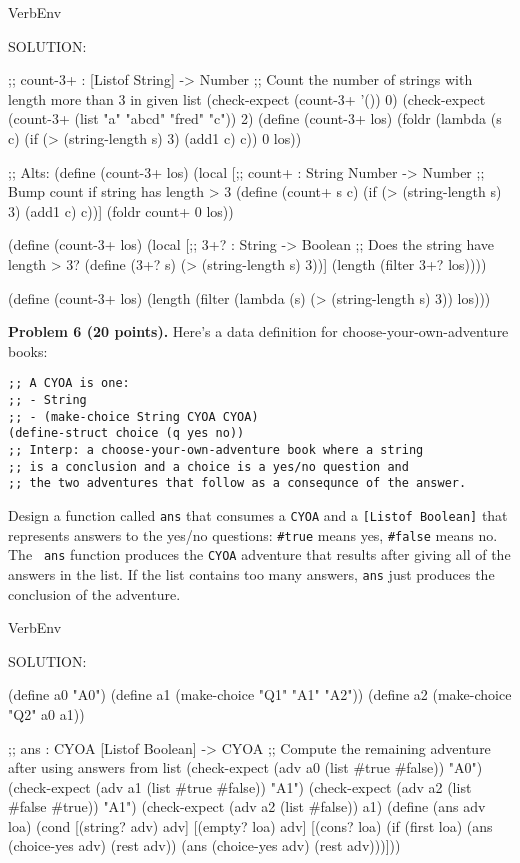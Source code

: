 \documentclass[12pt]{article}
\begin{document}
\begin{SaveVerbatim}{VerbEnv}


SOLUTION:

;; count-3+ : [Listof String] -> Number
;; Count the number of strings with length more than 3 in given list
(check-expect (count-3+ '()) 0)
(check-expect (count-3+ (list "a" "abcd" "fred" "c")) 2)
(define (count-3+ los)
  (foldr (lambda (s c) (if (> (string-length s) 3) (add1 c) c)) 0 los))

;; Alts:
(define (count-3+ los)
  (local [;; count+ : String Number -> Number
          ;; Bump count if string has length > 3
          (define (count+ s c) 
            (if (> (string-length s) 3) (add1 c) c))]
    (foldr count+ 0 los))

(define (count-3+ los)
  (local [;; 3+? : String -> Boolean
          ;; Does the string have length > 3?
          (define (3+? s) 
            (> (string-length s) 3))]
    (length (filter 3+? los))))

(define (count-3+ los)
  (length (filter (lambda (s) (> (string-length s) 3)) los)))
\end{SaveVerbatim}





\newpage

\noindent
{\bf Problem 6 (20 points).}
%
Here's a data definition for choose-your-own-adventure books:
\begin{verbatim}
;; A CYOA is one:
;; - String
;; - (make-choice String CYOA CYOA)
(define-struct choice (q yes no))
;; Interp: a choose-your-own-adventure book where a string
;; is a conclusion and a choice is a yes/no question and
;; the two adventures that follow as a consequnce of the answer.
\end{verbatim}

\noindent
Design a function called {\tt ans} that consumes a {\tt CYOA} and a
{\tt [Listof Boolean]} that represents answers to the yes/no
questions: {\tt \#true} means yes, {\tt \#false} means no.  The {\tt
  ans} function produces the {\tt CYOA} adventure that results after
giving all of the answers in the list.  If the list contains too many
answers, {\tt ans} just produces the conclusion of the adventure.


\begin{SaveVerbatim}{VerbEnv}


SOLUTION:

(define a0 "A0")
(define a1 (make-choice "Q1" "A1" "A2"))
(define a2 (make-choice "Q2" a0 a1))

;; ans : CYOA [Listof Boolean] -> CYOA
;; Compute the remaining adventure after using answers from list
(check-expect (adv a0 (list #true #false)) "A0")
(check-expect (adv a1 (list #true #false)) "A1")
(check-expect (adv a2 (list #false #true)) "A1")
(check-expect (adv a2 (list #false)) a1)
(define (ans adv loa)
  (cond [(string? adv) adv]
        [(empty? loa) adv]
        [(cons? loa)
         (if (first loa)
             (ans (choice-yes adv) (rest adv))
             (ans (choice-yes adv) (rest adv)))]))
\end{SaveVerbatim}

\end{document}
